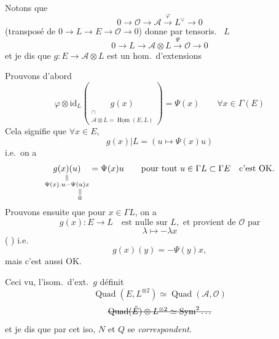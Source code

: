 \documentclass[11pt,a4paper]{article}
\begin{document}
Notons que
\[
  0 \to \mathcal{O} \to \mathcal{A} \xrightarrow{\ \varphi\ } L^{\vee} \to 0
\]
(transposé de $0 \to L \to E \to \mathcal{O} \to 0$) donne par tensoris.\  $L$
\[
  0 \to L \to \mathcal{A} \otimes L \xrightarrow{\ \Psi\ } \mathcal{O} \to 0
\]
et je dis que $g : E \to \mathcal{A} \otimes L$ est un hom.\ d'extensions



Prouvons d'abord
\[
  \varphi \otimes \mathrm{id}_L (\underset{\substack{\cap \\ \mathcal{A} \otimes L = \underline{\operatorname{Hom}}(E, L)}}{g(x)}) = \Psi(x) \qquad \forall x \in \Gamma(E)
\]
Cela signifie que $\forall x \in E$,
\[
  g(x) | L = (u \mapsto \Psi(x) u)
\]
i.e.\ on a
\[
  \underset{\substack{\| \\ \Psi(x) . u - \Psi(u) x \\ \hphantom{\Psi(x) . u - {}} \| \\ \hphantom{\Psi(x) . u - {}} 0}}{g(x)(u)} = \Psi(x) u \qquad \text{pour tout } u \in \Gamma L \subset \Gamma E \quad \text{c'est OK.}
\]
Prouvons ensuite que pour $x \in \Gamma L$, on a
\[
  g(x) : E \to L \quad \text{est nulle sur } L, \text{ et provient de } \mathcal{O} \text{ par}
\]
\[
  \lambda \mapsto -\lambda x
\]
( \ill{}) i.e.
\[
  g(x)(y) = -\Psi(y) x ,
\]
mais c'est aussi OK.

Ceci vu, l'isom.\ d'ext.\ $g$ définit
\[
  \operatorname{Quad}(E, L^{\otimes 2}) \simeq \operatorname{Quad}(\mathcal{A}, \mathcal{O})
\]
\[
  \text{\struck{$\operatorname{Quad}(\check{E}) \otimes L^{\otimes 2} \simeq \operatorname{Sym}^2 \ldots$}}
\]
et je dis que par cet iso, $N$ et $Q$ se \emph{correspondent}.
\end{document}
